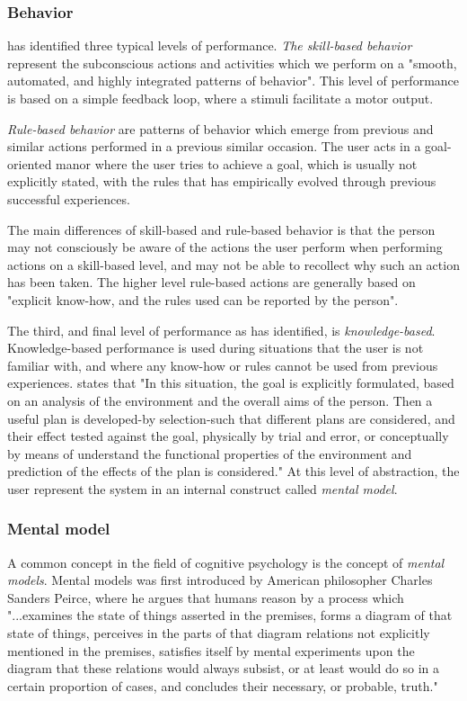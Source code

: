 \subsubsection{Behavior}
\cite{Rasmussen1983} has identified three typical levels of performance. \textit{The skill-based behavior} represent the subconscious actions and activities which we perform on a "smooth, automated, and highly integrated patterns of behavior". This level of performance is based on a simple feedback loop, where a stimuli facilitate a motor output. 

\textit{Rule-based behavior} are patterns of behavior which emerge from previous and similar actions performed in a previous similar occasion. The user acts in a goal-oriented manor where the user tries to achieve a goal, which is usually not explicitly stated, with the rules that has empirically evolved through previous successful experiences.

The main differences of skill-based and rule-based behavior is that the person may not consciously be aware of the actions the user perform when performing actions on a skill-based level, and may not be able to recollect why such an action has been taken. The higher level rule-based actions are generally based on "explicit know-how, and the rules used can be reported by the person".

The third, and final level of performance as \cite{Rasmussen1983} has identified, is \textit{knowledge-based}. Knowledge-based performance is used during situations that the user is not familiar with, and where any know-how or rules cannot be used from previous experiences. \cite{Rasmussen1983} states that "In this situation, the goal is explicitly formulated, based on an analysis of the environment and the overall aims of the person. Then a useful plan is developed-by selection-such that different plans are considered, and their effect tested against the goal, physically by trial and error, or conceptually by means of understand the functional properties of the environment and prediction of the effects of the plan is considered." At this level of abstraction, the user represent the system in an internal construct called \textit{mental model}.

\subsubsection{Mental model}
A common concept in the field of cognitive psychology is the concept of \textit{mental models}. Mental models was first introduced by American philosopher Charles Sanders Peirce, where he argues that humans reason by a process which
"...examines the state of things
asserted in the premises, forms a diagram of that state of things, perceives in the parts of that diagram relations not explicitly mentioned in the premises, satisfies itself by mental experiments upon the diagram that these relations would always subsist, or at least would do so in a certain proportion of cases, and concludes their necessary, or probable, truth." \cite{Pierce1974}

